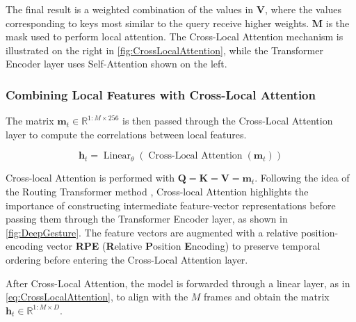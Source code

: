 The final result is a weighted combination of the values in \( \mathbf{V} \), where the values corresponding to keys most similar to the query receive higher weights. $\mathbf{M}$ is the mask used to perform local attention. The Cross-Local Attention mechanism is illustrated on the right in \autoref{fig:CrossLocalAttention}, while the Transformer Encoder layer uses Self-Attention shown on the left.

\subsubsection{Combining Local Features with Cross-Local Attention}


The matrix $\mathbf{m}_{t} \in \mathbb{R}^{1:M \times 256}$ is then passed through the Cross-Local Attention layer to compute the correlations between local features.


\begin{equation}
	\mathbf{h}_{t}  = \operatorname{Linear}_{\theta}  ( \operatorname{Cross-Local\ Attention}( \mathbf{m}_{t}) )
	\label{eq:CrossLocalAttention}
\end{equation}


Cross-local Attention is performed with $\mathbf{Q} = \mathbf{K} = \mathbf{V} = \mathbf{m}_{t}$.
Following the idea of the Routing Transformer method \citep{roy2021efficient}, Cross-local Attention highlights the importance of constructing intermediate feature-vector representations before passing them through the Transformer Encoder layer, as shown in \autoref{fig:DeepGesture}.
The feature vectors are augmented with a relative position-encoding vector \textbf{RPE} (\textbf{R}elative \textbf{P}osition \textbf{E}ncoding) to preserve temporal ordering before entering the Cross-Local Attention layer.

After Cross-Local Attention, the model is forwarded through a linear layer, as in \autoref{eq:CrossLocalAttention}, to align with the $M$ frames and obtain the matrix $\mathbf{h}_t \in \mathbb{R}^{1:M \times D}$.

